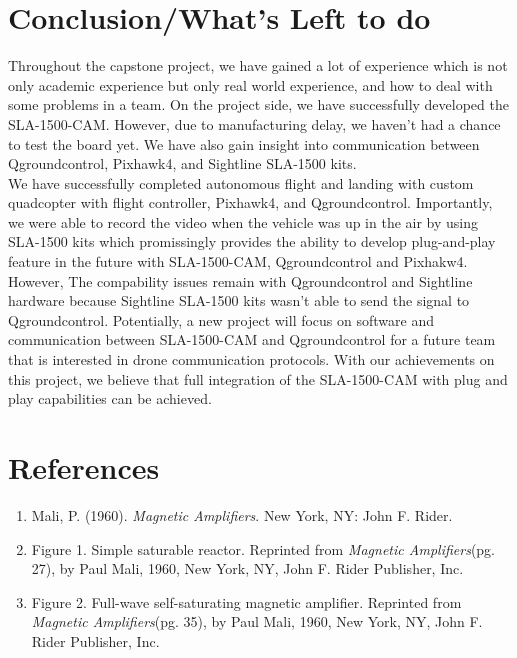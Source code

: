 \documentclass[11pt]{article}
\begin{document}
\section{Conclusion/What's Left to do}
Throughout the capstone project, we have gained a lot of experience which is not only academic experience but only real world experience, and how to deal with some problems in a team. On the project side, we have successfully developed the SLA-1500-CAM. However, due to manufacturing delay, we haven't had a chance to test the board yet. We have also gain insight into communication between Qgroundcontrol, Pixhawk4, and Sightline SLA-1500 kits. \\
We have successfully completed autonomous flight and landing with custom quadcopter with flight controller, Pixhawk4, and Qgroundcontrol. Importantly, we were able to record the video when the vehicle was up in the air by using SLA-1500 kits which promissingly provides the ability to develop plug-and-play feature in the future with SLA-1500-CAM, Qgroundcontrol and Pixhakw4. \\
However, The compability issues remain with Qgroundcontrol and Sightline hardware because Sightline SLA-1500 kits wasn't able to send the signal to Qgroundcontrol. Potentially, a new project will focus on software and communication between SLA-1500-CAM and Qgroundcontrol for a future team that is interested in drone communication protocols. With our achievements on this project, we believe that full integration of the SLA-1500-CAM with plug and play capabilities can be achieved.     


\pagebreak

\section{References}
\begin{enumerate}
\item Mali, P. (1960).\textit{ Magnetic Amplifiers}. New York, NY: John F. Rider.
\item Figure 1. Simple saturable reactor. Reprinted from \textit{Magnetic Amplifiers}(pg. 27), by Paul Mali, 1960, New York, NY, John F. Rider Publisher, Inc.
\item Figure 2. Full-wave self-saturating magnetic amplifier. Reprinted from \textit{Magnetic Amplifiers}(pg. 35), by Paul Mali, 1960, New York, NY, John F. Rider Publisher, Inc.
\end{enumerate}	
\end{document}
